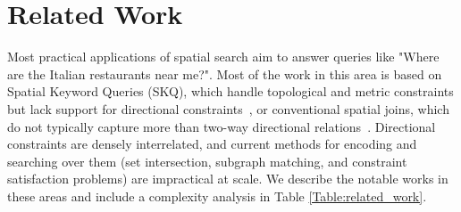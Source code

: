 \section{Related Work}
\label{section:related}
\normalsize




\par{
    Most practical applications of spatial search aim to answer queries like "Where are the Italian restaurants near me?".
    Most of the work in this area is based on Spatial Keyword Queries (SKQ), which handle topological and metric constraints but lack support for directional constraints~\cite{Guo2015, Cao2012, Zhang2009, Osul2023}, or conventional spatial joins, which do not typically capture more than two-way directional relations~\cite{Jacox2007}. 
    Directional constraints are densely interrelated, and current methods for encoding and searching over them (set intersection, subgraph matching, and constraint satisfaction problems) are impractical at scale.
    We describe the notable works in these areas and include a complexity analysis in Table \ref{Table:related_work}.
}


